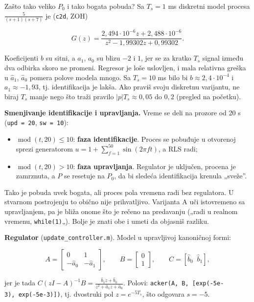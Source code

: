 \documentclass[11pt,a4paper,parskip=half,headsepline,numbers=noenddot]{scrartcl}
\begin{document}
Zašto tako veliko \(P_0\) i tako bogata pobuda? Sa \(T_s = 1\) ms diskretni model procesa \(\frac{5}{(s+1)(s+7)}\) je (\texttt{c2d}, ZOH)

\[G(z) = \frac{2{,}494\cdot10^{-6}z + 2{,}488\cdot10^{-6}}{z^2 - 1{,}99302z + 0{,}99302}.\]

Koeficijenti \(b\) su sitni, a \(a_1\), \(a_0\) su blizu \(-2\) i \(1\), jer se za kratko \(T_s\) signal između dva odbirka skoro ne promeni. Regresor je loše uslovljen, i mala relativna greška u \(\hat a_1\), \(\hat a_0\) pomera polove modela mnogo. Sa \(T_s = 10\) ms bilo bi \(b \approx 2{,}4\cdot10^{-4}\) i \(a_1 \approx -1{,}93\), tj. identifikacija je lakša. Ako praviš svoju diskretnu varijantu, ne biraj \(T_s\) manje nego što traži pravilo \(|p|T_s \approx 0{,}05\) do \(0{,}2\) (pregled na početku).

\textbf{Smenjivanje identifikacije i upravljanja.} Vreme se deli na prozore od 20 s (\texttt{upd\ =\ 20}, \texttt{sw\ =\ 10}):

\begin{itemize}
\item \(\operatorname{mod}(t, 20) \le 10\): \textbf{faza identifikacije}. Proces se pobuđuje u otvorenoj sprezi generatorom \(u = 1 + \sum_{f=1}^{50}\sin(2\pi ft)\), a RLS radi;
\item \(\operatorname{mod}(t, 20) > 10\): \textbf{faza upravljanja}. Regulator je uključen, procena je zamrznuta, a \(P\) se resetuje na \(P_0\), da bi sledeća identifikacija krenula „sveže''.
\end{itemize}

Tako je pobuda uvek bogata, ali proces pola vremena radi bez regulatora. U stvarnom postrojenju to obično nije prihvatljivo. Varijanta A uči istovremeno sa upravljanjem, pa je bliža onome što je rečeno na predavanju („radi u realnom vremenu, \texttt{while(1)}„). Bolje je znati obe i umeti da objasniš razliku.

\textbf{Regulator} (\texttt{update\_\allowbreak{}controller.m}). Model u upravljivoj kanoničnoj formi:

\[A = \begin{bmatrix}0 & 1\\ -\hat a_0 & -\hat a_1\end{bmatrix},\qquad B = \begin{bmatrix}0\\ 1\end{bmatrix},\qquad C = [\hat b_0\;\; \hat b_1],\]

jer je tada \(C(zI - A)^{-1}B = \frac{\hat b_1z + \hat b_0}{z^2 + \hat a_1z + \hat a_0}\). Polovi: \texttt{acker(\allowbreak{}A,\allowbreak{}\ B,\allowbreak{}\ {[}exp(\allowbreak{}-5e-3),\allowbreak{}\ exp(\allowbreak{}-5e-3){]})}, tj. dvostruki pol \(z = e^{-5T_s}\), što odgovara \(s = -5\).
\end{document}
